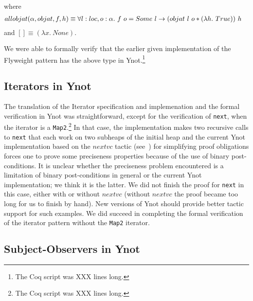 where
\begin{align*}
allobjat(\alpha, objat, f, h) &\equiv \forall l : \LOC, o : \alpha.\ f\ o = Some\ l \rightarrow (objat\ l\ o * (\lambda h.\ \TRUE))\ h
\end{align*}
and $[] \equiv (\lambda x.\ None)$.

We were able to formally verify that the earlier given implementation of
the Flyweight pattern has the above type in Ynot.\footnote{The Coq script was
  XXX lines long.}

\subsection{Iterators in Ynot}
\label{sec:iterators-in-ynot}

The translation of the Iterator specification and implemenation and the
formal verification in Ynot was straightforward, except for the
verification of {\tt next}, when the iterator is a {\tt Map2}.\footnote{The
  Coq script was XXX lines long.}  In that case, the implementation makes
two recursive calls to {\tt next} that each work on two subheaps of the
initial heap and the current Ynot implementation based on the $nextvc$
tactic (see~\cite{nanevski08}) for simplifying proof obligations forces one
to prove some preciseness properties because of the use of binary
post-conditions. It is unclear whether the preciseness problem encountered
is a limitation of binary post-conditions in general or the current Ynot
implementation; we think it is the latter. We did not finish the proof for
{\tt next} in this case, either with or without $nextvc$ (without $nextvc$
the proof became too long for us to finish by hand).  New versions of Ynot
should provide better tactic support for such examples. 
We did succeed in completing the formal verification of the
iterator pattern  without the {\tt Map2} iterator.


\subsection{Subject-Observers in Ynot}
\label{sec:subject-observer-in-ynot}

